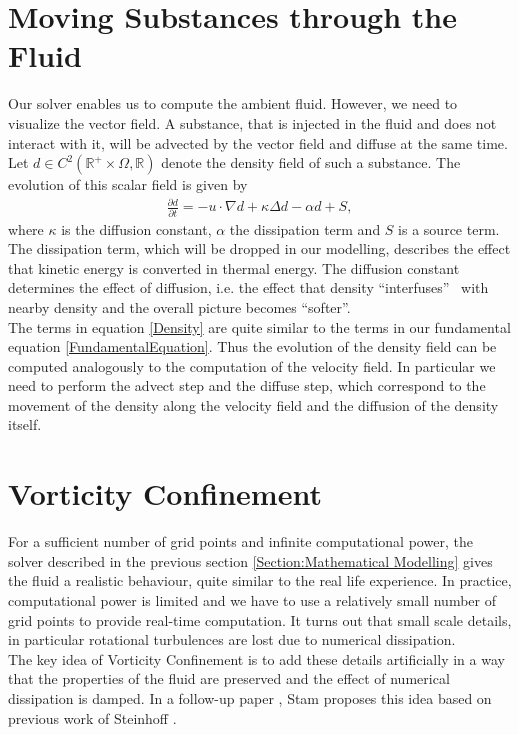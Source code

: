\documentclass[a4paper,10pt,oneside,final,german,openbib,pdftex,titlepage]{scrbook}
\begin{document}
\section{Moving Substances through the Fluid}
Our solver enables us to compute the ambient fluid. However, we need to visualize the vector field. A substance, that is injected in the fluid and does not interact with it, will be advected by the vector field and diffuse at the same time. Let $d \in C^2(\mathbb{R}^+\times\Omega, \mathbb{R})$ denote the density field of such a substance. The evolution of this scalar field is given by
\begin{align}
	\frac{\partial d}{\partial t} = - u \cdot \nabla d + \kappa \Delta d - \alpha  d + S, \label{Density}
\end{align}
where $\kappa$ is the diffusion constant, $\alpha$ the dissipation term and $S$ is a source term. The dissipation term, which will be dropped in our modelling, describes the effect that kinetic energy is converted in thermal energy. The diffusion constant determines the effect of diffusion, i.e. the effect that density ``interfuses'' ~with nearby density and the overall picture becomes ``softer''.\\

The terms in equation \ref{Density} are quite similar to the terms in our fundamental equation \ref{FundamentalEquation}. Thus the evolution of the density field can be computed analogously to the computation of the velocity field. In particular we need to perform the advect step and the diffuse step, which correspond to the movement of the density along the velocity field and the diffusion of the density itself.

\section{Vorticity Confinement}
For a sufficient number of grid points and infinite computational power, the solver described in the previous section \ref{Section:Mathematical Modelling} gives the fluid a realistic behaviour, quite similar to the real life experience. In practice, computational power is limited and we have to use a relatively small number of grid points to provide real-time computation. It turns out that small scale details, in particular rotational turbulences are lost due to numerical dissipation.\\

The key idea of Vorticity Confinement is to add these details artificially in a way that the properties of the fluid are preserved and the effect of numerical dissipation is damped. In a follow-up paper \cite{Stam2}, Stam proposes this idea based on previous work of Steinhoff \cite{Steinhoff}.\\
\end{document}
